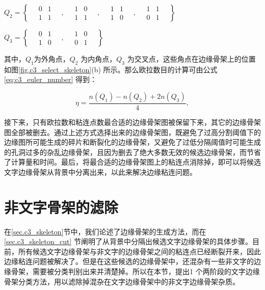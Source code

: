         $Q_2 = \left\{
        \quad
        \begin{matrix} 0 & 1 \\ 1 & 1 \end{matrix}\quad,\quad
        \begin{matrix} 1 & 0 \\ 1 & 1 \end{matrix}\quad,\quad
        \begin{matrix} 1 & 1 \\ 1 & 0 \end{matrix}\quad,\quad
        \begin{matrix} 1 & 1 \\ 0 & 1 \end{matrix}
        \quad
        \right\}$

        $Q_3 = \left\{
        \quad
        \begin{matrix} 0 & 1 \\ 1 & 0 \end{matrix}\quad,\quad
        \begin{matrix} 1 & 0 \\ 0 & 1
        \end{matrix}
        \quad
        \right\}$

        其中，$Q_1$为外角点，$Q_2$ 为内角点，$Q_3$ 为交叉点，这些角点在边缘骨架上的位置如图\ref{fig.c3_select_skeleton}(b) 所示。那么欧拉数目的计算可由公式\ref{eq:c3_euler_number} 得到：

        \begin{equation}
        \eta=\frac{n(Q_1)-n(Q_2)+2n(Q_3)}{4},
        \label{eq:c3_euler_number}
        \end{equation}

        接下来，只有欧拉数和粘连点数最合适的边缘骨架图被保留下来，其它的边缘骨架图全部被删去。通过上述方式选择出来的边缘骨架图，既避免了过高分割阈值下的边缘图所可能生成的碎片和断裂化的边缘骨架，又避免了过低分隔阈值时可能生成的孔洞过多的杂乱边缘骨架，且因为删去了绝大多数无效的候选边缘骨架，而节省了计算量和时间。最后，将最合适的边缘骨架图上的粘连点消除掉，即可以将候选文字边缘骨架从背景中分离出来，以此来解决边缘粘连问题。

    \section{非文字骨架的滤除}

    在\ref{sec.c3_skeleton}节中，我们论述了边缘骨架的生成方法，而在\ref{sec.c3_skeleton_cut} 节阐明了从背景中分隔出候选文字边缘骨架的具体步骤。目前，所有候选文字边缘骨架与非文字的边缘骨架之间的粘连点已经断裂开来，因此边缘粘连问题被解决了。但是在这些候选的边缘骨架中，还混杂有一些非文字的边缘骨架，需要被分类判别出来并清楚掉。所以在本节，提出1 个两阶段的文字边缘骨架分类方法，用以滤除掉混杂在文字边缘骨架中的非文字边缘骨架杂质。

